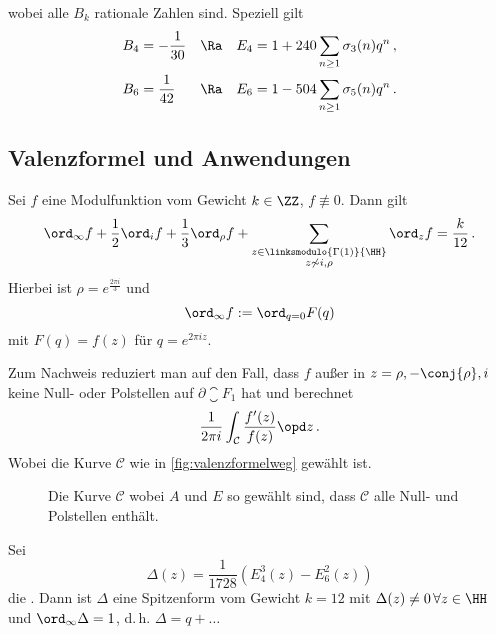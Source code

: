 wobei alle $B_k$ rationale Zahlen sind. Speziell gilt 
\begin{align*}
	B_4 &= -\frac 1{30} &&\Ra& E_4 &= 1 + 240 \sum_{n \geq 1} \sigma_3 (n) q^n
	\,, \\
	B_6 &= \frac 1{42} &&\Ra& E_6 &= 1 - 504 \sum_{n \geq 1} \sigma_5 (n) q^n
	\,.
\end{align*}

\subsection{Valenzformel und Anwendungen}

\begin{satz}[Valenzformel]
Sei $f$ eine Modulfunktion vom Gewicht $k \in \ZZ$, $f \not \equiv 0$. Dann gilt
\[
	\ord_\infty f + \frac 12 \ord_i f + \frac 13 \ord_\rho f + \sum_{\substack{z \in \linksmodulo{\Gamma(1)}{\HH} \\ z \not \sim i, \rho}} \ord_z f = \frac {k}{12}
	\,.
\]
Hierbei ist $\rho = e^{\frac{2 \pi i}{3}}$ und
\[
	\ord_\infty f := \ord_{q = 0} F(q)
\]
mit $F(q) = f(z)$ für $q = e^{2\pi i z}$.
\end{satz}

\begin{bewe}
Zum Nachweis reduziert man auf den Fall, dass $f$ außer in $z = \rho, - \conj{\rho}, i$ keine Null- oder Polstellen auf $\partial \closure{F_1}$ hat und berechnet
\[
	\frac{1}{2\pi i} \int_{\mathcal C} \frac{f'(z)}{f(z)} \opd z
	\,.
\]
Wobei die Kurve $\mathcal C$ wie in \autoref{fig:valenzformelweg} gewählt ist.

\begin{figure}
\begin{center}
	
	\caption{Die Kurve $\mathcal C$ wobei $A$ und $E$ so gewählt sind, dass $\mathcal C$ alle Null- und Polstellen enthält.}
	\label{fig:valenzformelweg}
\end{center}
\end{figure}
\end{bewe}

\begin{defi}
Sei
\[
	\Delta (z) = \frac{1}{1728} \left( E_4^3(z) - E_6^2(z) \right)
\]
die . Dann ist $\Delta$ eine Spitzenform vom Gewicht $k = 12$ mit $\Delta(z) \neq 0 \, \forall z \in \HH$ und $\ord_\infty \Delta = 1$, d.\,h. $\Delta = q + \ldots$
\end{defi}

